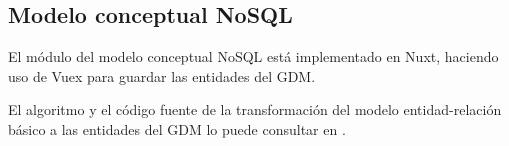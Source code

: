 \subsection{Modelo conceptual NoSQL}

El módulo del modelo conceptual NoSQL está implementado en Nuxt, haciendo uso de Vuex para guardar las entidades del GDM.

El algoritmo y el código fuente de la transformación del modelo entidad-relación básico a las entidades del GDM lo puede consultar en .
